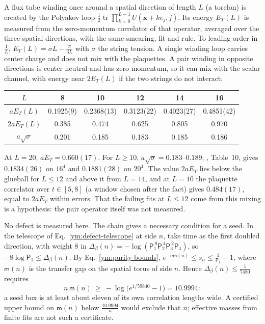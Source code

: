 A flux tube winding once around a spatial direction of length $L$ (a
torelon) is created by the Polyakov loop
$\frac12\operatorname{tr}\prod_{k=0}^{L-1}U(\mathbf x+ke_j,j)$. Its energy
$E_T(L)$ is measured from the zero-momentum correlator of that operator,
averaged over the three spatial directions, with the same smearing, fit and
rule. To leading order in $\frac1L$, $E_T(L)=\sigma L-\frac{\pi}{3L}$ with
$\sigma$ the string tension. A single winding loop carries center charge and
does not mix with the plaquettes. A pair winding in opposite directions is
center neutral and has zero momentum, so it can mix with the scalar channel,
with energy near $2E_T(L)$ if the two strings do not interact:
\begin{center}
\begin{tabular}{cccccc}
$L$ & 8 & 10 & 12 & 14 & 16\\\hline
$aE_T(L)$ & 0.1925(9) & 0.2368(13) & 0.3123(22) & 0.4023(27) & 0.4851(42)\\
$2aE_T(L)$ & 0.385 & 0.474 & 0.625 & 0.805 & 0.970\\
$a\sqrt\sigma$ & 0.201 & 0.185 & 0.183 & 0.185 & 0.186
\end{tabular}
\end{center}
At $L=20$, $aE_T=0.660(17)$. For $L\ge10$, $a\sqrt\sigma=0.183$--$0.189$;
\cite{Teper1998}, Table~10, gives $0.1834(26)$ on $16^4$ and $0.1881(28)$ on
$20^4$. The value $2aE_T$ lies below the glueball for $L\le12$ and above it
from $L=14$, and at $L=10$ the plaquette correlator over $t\in[5,8]$ (a window
chosen after the fact) gives $0.484(17)$, equal to $2aE_T$ within errors. That
the failing fits at $L\le12$ come from this mixing is a hypothesis: the pair
operator itself was not measured.

No defect is measured here. The chain gives a necessary condition for a seed.
In the telescope of Eq.~\eqref{ym:defect-telescope} at side $n$, take time
as the first doubled direction, with weight $8$ in
$\Delta_\beta(n)=-\log(\mathsf P_1^{\,8}\mathsf P_2^{\,4}\mathsf P_3^{\,2}
\mathsf P_4)$, so $-8\log\mathsf P_1\le\Delta_\beta(n)$. By
Eq.~\eqref{ym:purity-bounds},
$e^{-n\mathsf m(n)}\le s_n\le\frac1{\mathsf P_1}-1$, where $\mathsf m(n)$ is
the transfer gap on the spatial torus of side $n$. Hence
$\Delta_\beta(n)\le\frac1{7480}$ requires
\begin{equation}\label{ym:num-necessary}
 n\,\mathsf m(n)\ \ge\ -\log\big(e^{1/59840}-1\big)=10.9994:
\end{equation}
a seed box is at least about eleven of its own correlation lengths wide. A
certified upper bound on $\mathsf m(n)$ below $\frac{10.9994}{n}$ would exclude
that $n$; effective masses from finite fits are not such a certificate.

